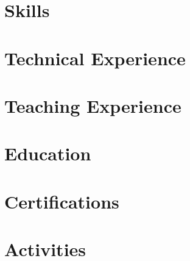 \documentclass[letter,10pt]{article}
\begin{document}
\pagestyle{first_page}

\justify


\section{Skills} 


\section{Technical Experience}


\section{Teaching Experience}


\newpage\pagestyle{others}

\section{Education}


\section{Certifications}


\section{Activities}

\end{document}
